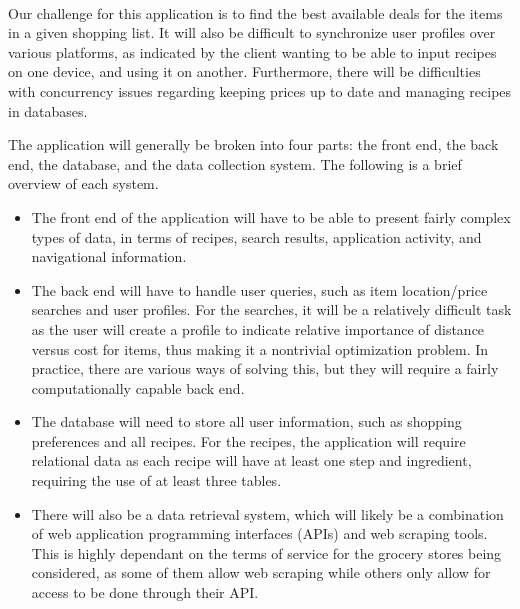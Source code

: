 
\\Our challenge for this application is to find the best available deals for the items in a given shopping list.  It will also be difficult to synchronize user profiles over various platforms, as indicated by the client wanting to be able to input recipes on one device, and using it on another.  Furthermore, there will be difficulties with concurrency issues regarding keeping prices up to date and managing recipes in databases.

The application will generally be broken into four parts: the front end, the back end, the database, and the data collection system.  The following is a brief overview of each system.
\begin{itemize}
    \item The front end of the application will have to be able to present fairly complex types of data, in terms of recipes, search results, application activity, and navigational information.
    \item The back end will have to handle user queries, such as item location/price searches and user profiles.  For the searches, it will be a relatively difficult task as the user will create a profile to indicate relative importance of distance versus cost for items, thus making it a nontrivial optimization problem.  In practice, there are various ways of solving this, but they will require a fairly computationally capable back end.
    \item The database will need to store all user information, such as shopping preferences and all recipes.  For the recipes, the application will require relational data as each recipe will have at least one step and ingredient, requiring the use of at least three tables.
    \item There will also be a data retrieval system, which will likely be a combination of web application programming interfaces (APIs) and web scraping tools.  This is highly dependant on the terms of service for the grocery stores being considered, as some of them allow web scraping while others only allow for access to be done through their API.
\end{itemize}

